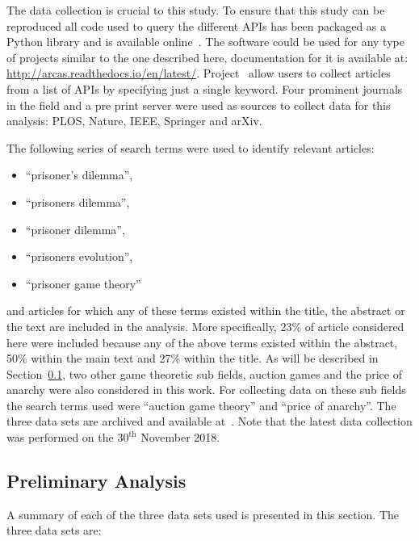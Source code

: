 \documentclass{article}
\theoremstyle{definition}
\begin{document}
The data collection is crucial to this study. To ensure that this study can be
reproduced all code used to query the different APIs has been packaged as a
Python library and is available online~\cite{nikoleta_2017}. The software could
be used for any type of projects similar to the one described here,
documentation for it is available at:
\url{http://arcas.readthedocs.io/en/latest/}. Project~\cite{nikoleta_2017} allow
users to collect articles from a list of APIs by specifying just a single
keyword. Four prominent journals in the field and a pre print server were used
as sources to collect data for this analysis: PLOS, Nature, IEEE, Springer and
arXiv.

The following series of search terms were used to identify relevant articles:

\begin{itemize}
    \item ``prisoner's dilemma'',
    \item ``prisoners dilemma'',
    \item ``prisoner dilemma'',
    \item ``prisoners evolution'',
    \item ``prisoner game theory''
\end{itemize}

and articles for which any of these terms existed within the title, the abstract
or the text are included in the analysis. More specifically, 23\% of article
considered here were included because any of the above terms existed within the
abstract, 50\% within the main text and 27\% within the title. As will be
described in Section~\ref{section:preliminary_analysis}, two other game
theoretic sub fields, auction games and the price of anarchy were also considered
in this work. For collecting data on these sub fields the search terms used were
``auction game theory'' and ``price of anarchy''. The three data sets are
archived and available at~\cite{auction_data_2018, anarchy_data_2018,
pd_data_2018}. Note that the latest data collection was performed on the \(30^{\text{th}}\)
November 2018.

\subsection{Preliminary Analysis}\label{section:preliminary_analysis}

A summary of each of the three data sets used is presented in this section.
The three data sets are:
\end{document}
